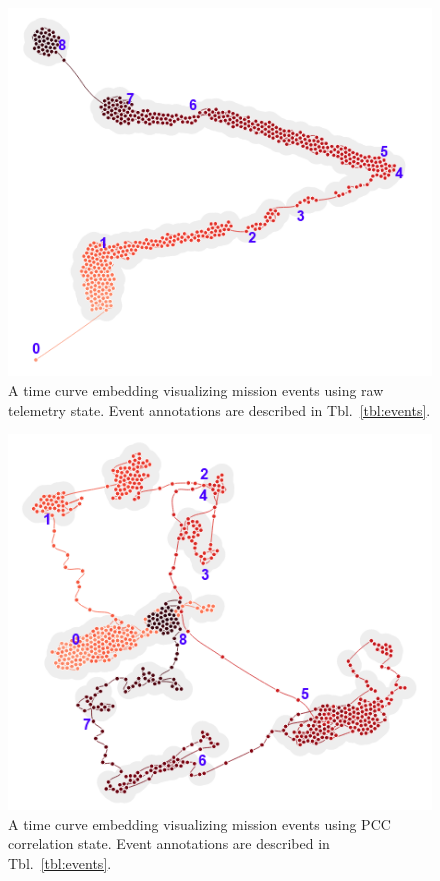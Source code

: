 \begin{figure}[h]
\centering
    \includegraphics{images/pfm2_raw_data_time_curve_annotated.png}
    \caption{A time curve embedding visualizing mission events using raw telemetry state. Event annotations are described in Tbl.~\ref{tbl:events}.}
    \label{fig:pfm2_raw_data_time_curve_annotated}
\end{figure}

\begin{figure}[h]
\centering
    \includegraphics{images/pfm2_pcc_time_curve_annotated.png}
    \caption{A time curve embedding visualizing mission events using PCC correlation state. Event annotations are described in Tbl.~\ref{tbl:events}.}
    \label{fig:pfm2_pcc_time_curve_annotated}
\end{figure}

